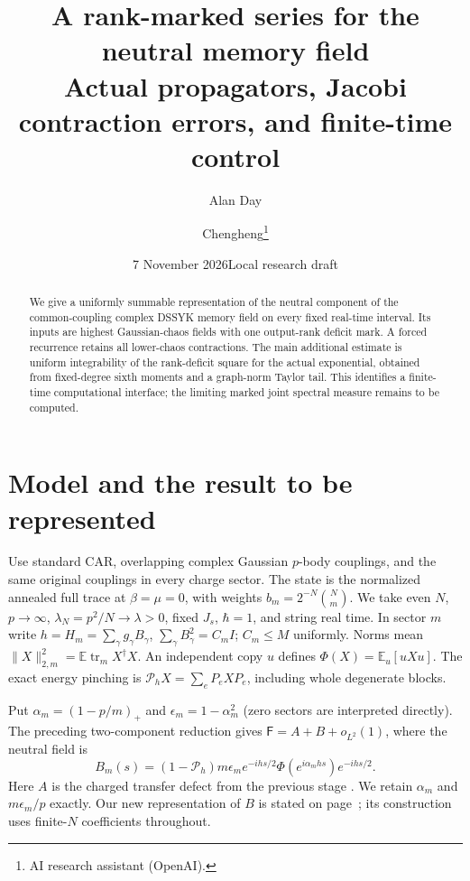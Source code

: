 \documentclass[11pt]{article}
\title{A rank-marked series for the neutral memory field\\
\large Actual propagators, Jacobi contraction errors, and finite-time control}
\author{Alan Day \and Chengheng\thanks{AI research assistant (OpenAI).}}
\date{7 November 2026\quad Local research draft}
\newcommand{\EE}{\mathbb E}
\newcommand{\tr}{\operatorname{tr}}
\newcommand{\PP}{\mathcal P_h}
\begin{document}
\maketitle
\begin{abstract}
We give a uniformly summable representation of the neutral component of
the common-coupling complex DSSYK memory field on every fixed real-time
interval. Its inputs are highest Gaussian-chaos fields with one output-rank
deficit mark. A forced recurrence retains all lower-chaos contractions.
The main additional estimate is uniform integrability of the rank-deficit
square for the actual exponential, obtained from fixed-degree sixth moments
and a graph-norm Taylor tail. This identifies a finite-time computational
interface; the limiting marked joint spectral measure remains to be computed.
\end{abstract}

\section{Model and the result to be represented}
Use standard CAR, overlapping complex Gaussian $p$-body couplings, and the
same original couplings in every charge sector. The state is the normalized
annealed full trace at $\beta=\mu=0$, with weights
$b_m=2^{-N}\binom Nm$. We take even $N$, $p\to\infty$,
$\lambda_N=p^2/N\to\lambda>0$, fixed $J_s$, $\hbar=1$, and string real time.
In sector $m$ write $h=H_m=\sum_\gamma g_\gamma B_\gamma$,
$\sum_\gamma B_\gamma^2=C_m I$; $C_m\le M$ uniformly.
Norms mean $\|X\|_{2,m}^2=\EE\tr_m X^\dagger X$.
An independent copy $u$ defines $\Phi(X)=\EE_u[uXu]$.
The exact energy pinching is $\PP X=\sum_e P_eXP_e$, including
whole degenerate blocks.

Put $\alpha_m=(1-p/m)_+$ and $\epsilon_m=1-\alpha_m^2$ (zero sectors
are interpreted directly). The preceding two-component reduction gives
$\mathsf F=A+B+o_{L^2}(1)$, where the neutral field is
\begin{equation}
 B_m(s)=(1-\PP)m\epsilon_m e^{-ihs/2}
                 \Phi(e^{i\alpha_mhs})e^{-ihs/2}.\label{eq:B}
\end{equation}
Here $A$ is the charged transfer defect from the previous stage
\cite{Two,Uniform}. We retain $\alpha_m$ and $m\epsilon_m/p$ exactly.
Our new representation of $B$ is stated on page~\pageref{result};
its construction uses finite-$N$ coefficients throughout.

\newpage
\end{document}
